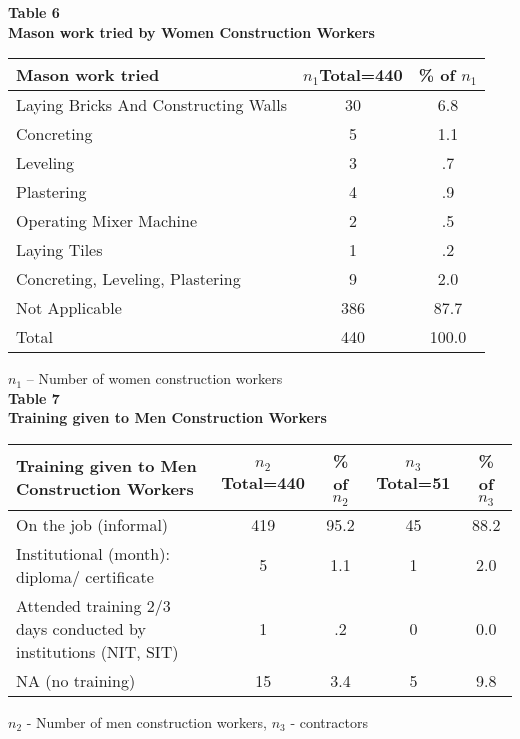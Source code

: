 \documentclass[12pt]{report}
\newcommand{\bt}[1]{\textbf{#1}}
\newcommand{\NI}{\noindent}
\begin{document}
  	\NI\bt{Table 6}\\
  	\bt{Mason work tried by Women Construction Workers}
  	\begin{longtable}{p{}@{\hskip 0.3in}c@{\hskip 0.3in}c@{\hskip 0.3in}}
  		\hline
  		\bt{Mason work tried} & $n_1${\footnotesize Total=440} & {\footnotesize\% of }$n_1$\\ \hline
  		Laying Bricks And Constructing Walls & 30 &  6.8 \\ \hline
  		Concreting & 5 & 1.1\\ \hline
  		Leveling & 3 & .7\\ \hline
  		Plastering & 4 & .9\\ \hline
  		Operating Mixer Machine & 2 & .5\\ \hline
  		Laying Tiles & 1 & .2\\ \hline
  		Concreting, Leveling, Plastering & 9 & 2.0\\ \hline
  		Not Applicable & 386 & 87.7\\ \hline
  		Total & 440 & 100.0\\ \hline
  	\end{longtable}
  	$n_1$ – Number of women construction workers\\
	
	\NI\bt{Table 7}\\
	\bt{Training given to Men Construction Workers}
	\begin{longtable}{p{}@{\hskip 0.1in}c@{\hskip 0.1in}c@{\hskip 0.1in}c@{\hskip 0.1in}c}
		\hline
		\bt{Training given to Men Construction Workers }  & $n_2${\footnotesize Total=440}  & {\footnotesize\% of }$n_2$   & $n_3${\footnotesize Total=51}  & {\footnotesize\% of }$n_3$\\ \hline
		 On the job (informal) & 419 & 95.2 & 45 & 88.2\\ \hline
		 Institutional (month): diploma/ certificate & 5 & 1.1 & 1 & 2.0\\ \hline
		 Attended training 2/3 days conducted by institutions (NIT, SIT) & 1 & .2 & 0 & 0.0\\ \hline
		 NA (no training) & 15 & 3.4 & 5 & 9.8\\ \hline
	\end{longtable}
	$n_2$ - Number of men construction workers, $n_3$ - contractors\\
	
\end{document}
